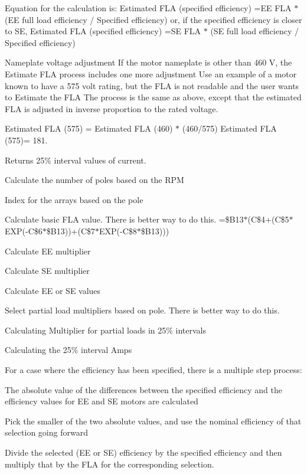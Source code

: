 Equation for the calculation is\+: Estimated F\+LA (specified efficiency) =EE F\+LA $\ast$ (EE full load efficiency / Specified efficiency) or, if the specified efficiency is closer to SE, Estimated F\+LA (specified efficiency) =SE F\+LA $\ast$ (SE full load efficiency / Specified efficiency)

Nameplate voltage adjustment If the motor nameplate is other than 460 V, the Estimate F\+LA process includes one more adjustment Use an example of a motor known to have a 575 volt rating, but the F\+LA is not readable and the user wants to Estimate the F\+LA The process is the same as above, except that the estimated F\+LA is adjusted in inverse proportion to the rated voltage.

Estimated F\+LA (575) = Estimated F\+LA (460) $\ast$ (460/575) Estimated F\+LA (575)= 181.

\begin{DoxyReturn}{Returns}
25\% interval values of current. 
\end{DoxyReturn}
Calculate the number of poles based on the R\+PM

Index for the arrays based on the pole

Calculate basic F\+LA value. There is better way to do this. =\$\+B13$\ast$(C\$4+(C\$5$\ast$\+E\+XP(-\/C\$6$\ast$\$\+B13))+(C\$7$\ast$\+E\+XP(-\/C\$8$\ast$\$\+B13)))

Calculate EE multiplier

Calculate SE multiplier

Calculate EE or SE values

Select partial load multipliers based on pole. There is better way to do this.

Calculating Multiplier for partial loads in 25\% intervals

Calculating the 25\% interval Amps

For a case where the efficiency has been specified, there is a multiple step process\+:
\begin{DoxyEnumerate}
\item The absolute value of the differences between the specified efficiency and the efficiency values for EE and SE motors are calculated
\item Pick the smaller of the two absolute values, and use the nominal efficiency of that selection going forward
\item Divide the selected (EE or SE) efficiency by the specified efficiency and then multiply that by the F\+LA for the corresponding selection.
\end{DoxyEnumerate}

